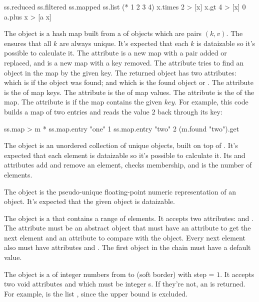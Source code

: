\begin{ffcode}
ss.reduced
  ss.filtered
    ss.mapped
      ss.list (* 1 2 3 4)
      x.times 2 > [x]
    x.gt 4 > [x]
  0
  a.plus x > [a x]
\end{ffcode}

The object  is a hash map built from a  of 
  objects which are pairs \((k, v)\).
The  ensures that all \(k\) are always unique.
It's expected that each \(k\) is dataizable so it's possible to calculate  it.
%
The  attribute is a new map with a pair added or replaced,
  and  is a new map with a key removed.
%
The  attribute tries to find an object in the map by the given key.
The returned object has two attributes:
   which is  if the object was found;
  and  which is the found object or .
%
The  attribute is the  of map keys.
%
The  attribute is the  of map values.
%
The  attribute is the  of the map.
%
The  attribute is  if the map contains the given \(key\).
For example, this code builds a map of two entries
  and reads the value \(2\) back through its key:

\begin{ffcode}
ss.map > m
  *
    ss.map.entry "one" 1
    ss.map.entry "two" 2
(m.found "two").get
\end{ffcode}

The object  is an unordered collection of unique objects,
  built on top of .
It's expected that each element is dataizable so it's possible to calculate  it.
%
Its  and  attributes add and remove an element,
   checks membership, and  is the number of elements.

The object  is the pseudo-unique floating-point numeric
  representation of an object.
It's expected that the given object is dataizable.

The object  is a  that contains a range of elements.
It accepts two attributes:  and .
The attribute  must be an abstract object that must have an attribute
   to get the next element and an attribute  to compare with
  the  object.
Every next element also must have attributes  and .
The first object in the chain must have a default value.

The object  is a  of integer numbers
  from  to  (soft border) with step = \(1\).
It accepts two void attributes  and  which must be integer s.
If they're not, an  is returned.
For example,  is the list
  , since the upper bound is excluded.
